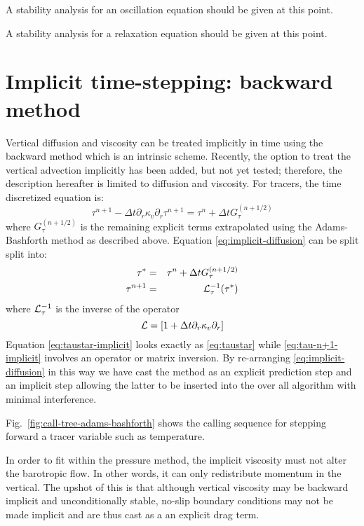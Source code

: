 A stability analysis for an oscillation equation should be given at this point.

A stability analysis for a relaxation equation should be given at this point.


\section{Implicit time-stepping: backward method}

Vertical diffusion and viscosity can be treated implicitly in time
using the backward method which is an intrinsic scheme. 
Recently, the option to treat the vertical advection 
implicitly has been added, but not yet tested; therefore, 
the description hereafter is limited to diffusion and viscosity.
For tracers,
the time discretized equation is:
\begin{equation}
\tau^{n+1} - \Delta t \partial_r \kappa_v \partial_r \tau^{n+1} =
\tau^{n} + \Delta t G_\tau^{(n+1/2)}
\label{eq:implicit-diffusion}
\end{equation}
where $G_\tau^{(n+1/2)}$ is the remaining explicit terms extrapolated
using the Adams-Bashforth method as described above.  Equation
\ref{eq:implicit-diffusion} can be split split into:
\begin{eqnarray}
\tau^* & = & \tau^{n} + \Delta t G_\tau^{(n+1/2)}
\label{eq:taustar-implicit} \\
\tau^{n+1} & = & {\cal L}_\tau^{-1} ( \tau^* )
\label{eq:tau-n+1-implicit}
\end{eqnarray}
where ${\cal L}_\tau^{-1}$ is the inverse of the operator
\begin{equation}
{\cal L} = \left[ 1 + \Delta t \partial_r \kappa_v \partial_r \right]
\end{equation}
Equation \ref{eq:taustar-implicit} looks exactly as \ref{eq:taustar}
while \ref{eq:tau-n+1-implicit} involves an operator or matrix
inversion. By re-arranging \ref{eq:implicit-diffusion} in this way we
have cast the method as an explicit prediction step and an implicit
step allowing the latter to be inserted into the over all algorithm
with minimal interference.

Fig.~\ref{fig:call-tree-adams-bashforth} shows the calling sequence for
stepping forward a tracer variable such as temperature.

In order to fit within the pressure method, the implicit viscosity
must not alter the barotropic flow. In other words, it can only
redistribute momentum in the vertical. The upshot of this is that
although vertical viscosity may be backward implicit and
unconditionally stable, no-slip boundary conditions may not be made
implicit and are thus cast as a an explicit drag term.

